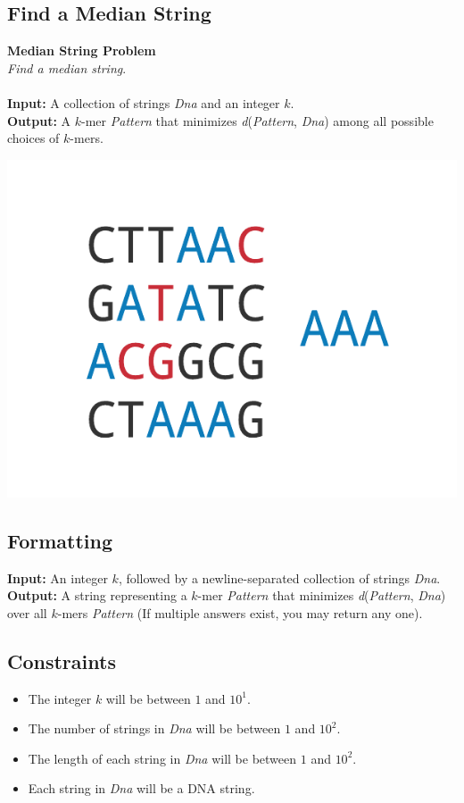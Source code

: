 \documentclass{article}
\begin{document}
\subsection{Find a Median String}
\hline\vspace{5}
\noindent\textbf{Median String Problem}\\
\emph{Find a median string}.\\ \\
\textbf{Input:} A collection of strings \emph{Dna} and an integer $k$.\\
\textbf{Output:} A $k$-mer \emph{Pattern} that minimizes \emph{d}(\emph{Pattern}, \emph{Dna}) among all possible choices of $k$-mers.
\begin{center}
    \includegraphics[scale=0.36]{c2/logos/2B.png} 
\end{center}
\hline\vspace{5}

\subsection*{Formatting}
\textbf{Input:} An integer $k$, followed by a newline-separated collection of strings \emph{Dna}.\\
\noindent\textbf{Output:} A string representing a $k$-mer \emph{Pattern} that minimizes \emph{d}(\emph{Pattern}, \emph{Dna}) over all $k$-mers \emph{Pattern} (If multiple answers exist, you may return any one).

\subsection*{Constraints}
\begin{itemize}
    \item The integer $k$ will be between $1$ and $10^1$.
    \item The number of strings in \emph{Dna} will be between $1$ and $10^2$.
    \item The length of each string in \emph{Dna} will be between $1$ and $10^2$.
    \item Each string in \emph{Dna} will be a DNA string.
\end{itemize}
\pagebreak
\end{document}

